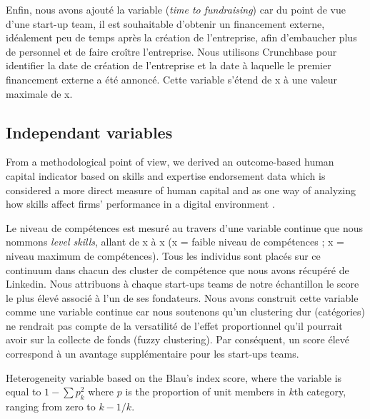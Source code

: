 \documentclass[12pt]{article}
\begin{document}
Enfin, nous avons ajouté la variable (\textit{time to fundraising}) car du point de vue d'une start-up team, il est souhaitable d'obtenir un financement externe, idéalement peu de temps après la création de l'entreprise, afin d'embaucher plus de personnel et de faire croître l'entreprise. Nous utilisons Crunchbase pour identifier la date de création de l'entreprise et la date à laquelle le premier financement externe a été annoncé. Cette variable s'étend de x à une valeur maximale de x.

\subsection{Independant variables}

From a methodological point of view, we derived an outcome-based human capital indicator based on skills and expertise endorsement data which is considered a more direct measure of human capital and as one way of analyzing how skills affect firms' performance in a digital environment \citep{marvel2016human}.

Le niveau de compétences est mesuré au travers d'une variable continue que nous nommons \textit{level skills}, allant de x à x (x = faible niveau de compétences ; x = niveau maximum de compétences). Tous les individus sont placés sur ce continuum dans chacun des cluster de compétence que nous avons récupéré de Linkedin. Nous attribuons à chaque start-ups teams de notre échantillon le score le plus élevé associé à l'un de ses fondateurs. Nous avons construit cette variable comme une variable continue car nous soutenons qu'un clustering dur (catégories) ne rendrait pas compte de la versatilité de l'effet proportionnel qu'il pourrait avoir sur la collecte de fonds (fuzzy clustering). Par conséquent, un score élevé correspond à un avantage supplémentaire pour les start-ups teams.

Heterogeneity variable based on the Blau's index score, where the variable is equal to $1-\sum p_k^2$ where $p$ is the proportion of unit members in $k$th category, ranging from zero to $k-1/k$.
\end{document}

